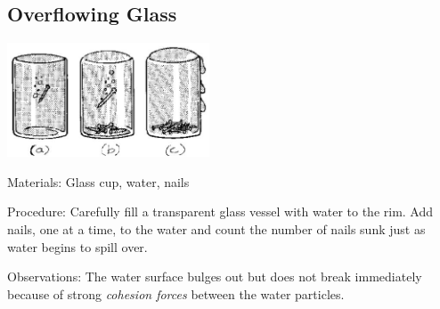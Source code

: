 \begin{multicols}{2}
\columnbreak

\subsection{Overflowing Glass}

\begin{center}
\includegraphics[width=0.45\textwidth]{./img/source/glass-overflow.jpg}
\end{center}

\begin{description*}
\item[Materials:]{Glass cup, water, nails}
\item[Procedure:]{Carefully fill a transparent glass vessel with water to the rim. Add nails, one at a time, to
the water and count the number of nails sunk just as water begins to spill over.}
\item[Observations:]{The water surface bulges out but does not break immediately because of strong \emph{cohesion
forces} between the water particles.}
\end{description*}


\end{multicols}
